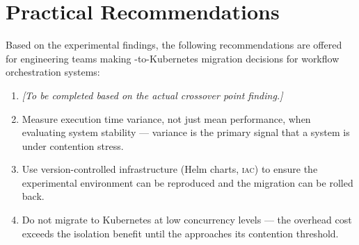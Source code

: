\section{Practical Recommendations}

Based on the experimental findings, the following recommendations are offered for
engineering teams making \vm{}-to-Kubernetes migration decisions for workflow orchestration
systems:

\begin{enumerate}
  \item \textit{[To be completed based on the actual crossover point finding.]}
  \item Measure execution time variance, not just mean performance, when evaluating system
        stability --- variance is the primary signal that a system is under contention
        stress.
  \item Use version-controlled infrastructure (Helm charts, \textsc{iac}) to ensure the
        experimental environment can be reproduced and the migration can be rolled back.
  \item Do not migrate to Kubernetes at low concurrency levels --- the overhead cost
        exceeds the isolation benefit until the \vm{} approaches its contention threshold.
\end{enumerate}
